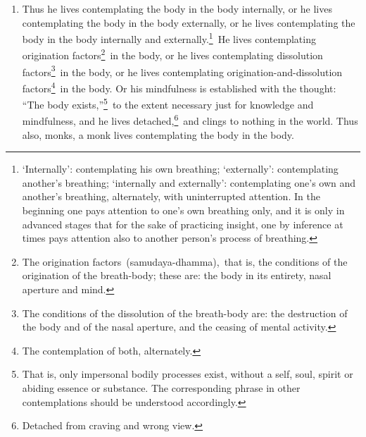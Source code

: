 \documentclass[a4 paper, 12pt]{article}
\begin{document}
\begin{enumerate}[resume]
\item Thus he lives contemplating the body in the body internally, or he lives contemplating the body in the body externally, or he lives contemplating the body in the body internally and externally.\footnote{‘Internally’: contemplating his own breathing; ‘externally’: contemplating another’s breathing; ‘internally and externally’: contemplating one’s own and another’s breathing, alternately, with uninterrupted attention. In the beginning one pays attention to one’s own breathing only, and it is only in advanced stages that for the sake of practicing insight, one by inference at times pays attention also to another person’s process of breathing.} He lives contemplating origination factors\footnote{The origination factors (samudaya-dhamma), that is, the conditions of the origination of the breath-body; these are: the body in its entirety, nasal aperture and mind.} in the body, or he lives contemplating dissolution factors\footnote{The conditions of the dissolution of the breath-body are: the destruction of the body and of the nasal aperture, and the ceasing of mental activity.} in the body, or he lives contemplating origination-and-dissolution factors\footnote{The contemplation of both, alternately.} in the body. Or his mindfulness is established with the thought: “The body exists,”\footnote{That is, only impersonal bodily processes exist, without a self, soul, spirit or abiding essence or substance. The corresponding phrase in other contemplations should be understood accordingly.} to the extent necessary just for knowledge and mindfulness, and he lives detached,\footnote{Detached from craving and wrong view.} and clings to nothing in the world. Thus also, monks, a monk lives contemplating the body in the body.
\end{enumerate}
\end{document}
